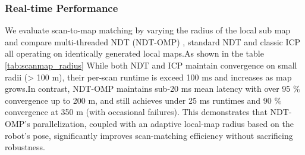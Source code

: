 %	
%	
%	
%			
%	
%		


\subsubsection{Real-time Performance }

We evaluate  scan-to-map matching by varying the radius of the local sub map and compare multi-threaded
NDT (NDT-OMP) , standard NDT and classic ICP all operating on identically generated local maps.As shown in the table \ref{tab:scanmap_radius} While both NDT and ICP maintain convergence on small radii (> 100 m), their per‐scan runtime  is exceed 100 ms and increases as map grows.In contrast, NDT-OMP maintains sub-20 ms mean latency with over 95 $\%$ convergence up to 200 m, and still achieves under 25 ms runtimes and 90 $\%$ convergence at 350 m (with occasional failures). This demonstrates that NDT-OMP’s parallelization, coupled with an adaptive local-map radius based on the robot’s pose, significantly improves scan-matching efficiency without sacrificing robustness.



